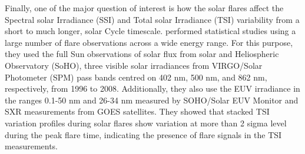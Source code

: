 \begin{table}[ht!]
    \centering
    \caption{Spectral Energy Distribution from a sample of 2100 flares across various wavelengths\citep{kretzschmar11}.}
    \label{tab:tab1_}
\end{table}

Finally, one of the major question of interest is how the solar flares affect the Spectral solar Irradiance (SSI) and Total solar Irradiance (TSI) variability from a short to much longer, solar Cycle timescale. \cite{kretzschmar10,kretzschmar11} performed statistical studies using a large number of flare observations across a wide energy range. For this purpose, they used the full Sun observations of solar flux from solar and Heliospheric Observatory (SoHO), three visible solar irradiances from VIRGO/Solar Photometer (SPM) pass bands centred on 402 nm, 500 nm, and 862 nm, respectively, from 1996 to 2008. Additionally, they also use the EUV irradiance in the ranges 0.1-50 nm and 26-34 nm measured by SOHO/Solar EUV Monitor \citep{judge98} and SXR measurements from GOES satellites. They showed that stacked TSI variation profiles during solar flares show variation at more than 2 sigma level during the peak flare time, indicating the presence of flare signals in the TSI measurements.

